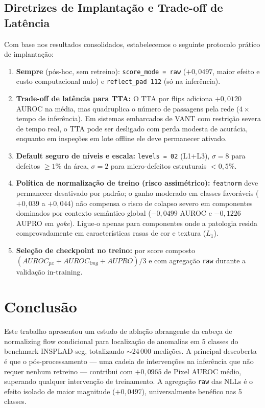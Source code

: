 \documentclass[conference]{IEEEtran}
\begin{document}
\subsection{Diretrizes de Implantação e Trade-off de Latência}

Com base nos resultados consolidados, estabelecemos o seguinte protocolo prático de implantação:

\begin{enumerate}
    \item \textbf{Sempre} (pós-hoc, sem retreino): \texttt{score\_mode\,=\,raw} ($+0{,}0497$, maior efeito e custo computacional nulo) e \texttt{reflect\_pad\,112} (só na inferência).
    \item \textbf{Trade-off de latência para TTA:} O TTA por flips adiciona $+0{,}0120$ AUROC na média, mas quadruplica o número de passagens pela rede ($4\times$ tempo de inferência). Em sistemas embarcados de VANT com restrição severa de tempo real, o TTA pode ser desligado com perda modesta de acurácia, enquanto em inspeções em lote offline ele deve permanecer ativado.
    \item \textbf{Default seguro de níveis e escala:} \texttt{levels\,=\,02} (L1+L3), $\sigma = 8$ para defeitos $\geq 1\%$ da área, $\sigma = 2$ para micro-defeitos estruturais $< 0{,}5\%$.
    \item \textbf{Política de normalização de treino (risco assimétrico):} \texttt{featnorm} deve permanecer desativado por padrão; o ganho moderado em classes favoráveis ($+0{,}039$ a $+0{,}044$) não compensa o risco de colapso severo em componentes dominados por contexto semântico global ($-0{,}0499$ AUROC e $-0{,}1226$ AUPRO em \textit{yoke}). Ligue-o apenas para componentes onde a patologia resida comprovadamente em características rasas de cor e textura ($L_1$).
    \item \textbf{Seleção de checkpoint no treino:} por score composto $(AUROC_{px} + AUROC_{img} + AUPRO)/3$ e com agregação \texttt{raw} durante a validação in-training.
\end{enumerate}


\section{Conclusão}
\label{sec:conclusion}

Este trabalho apresentou um estudo de ablação abrangente da cabeça de normalizing flow condicional para localização de anomalias em 5 classes do benchmark INSPLAD-seg, totalizando $\sim$24\,000 medições. A principal descoberta é que o pós-processamento --- uma cadeia de intervenções na inferência que não requer nenhum retreino --- contribui com $+0{,}0965$ de Pixel AUROC médio, superando qualquer intervenção de treinamento. A agregação \texttt{raw} das NLLs é o efeito isolado de maior magnitude ($+0{,}0497$), universalmente benéfico nas 5 classes.
\end{document}
